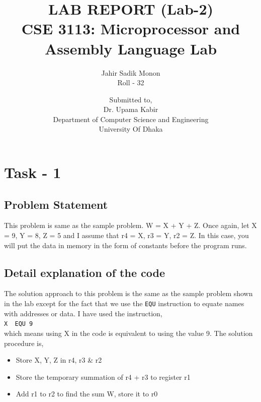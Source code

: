 \documentclass[footheight=20pt, footsepline, headheight=20pt, headsepline]{scrartcl}
\begin{document}
\title{LAB REPORT (Lab-2) \\[1cm] \large{\textbf{CSE 3113: Microprocessor and Assembly Language Lab}}\\[1cm]} 
\author{Jahir Sadik Monon \\ Roll - 32}
\date{\vspace{10cm}  Submitted to, \\[0.5cm] Dr. Upama Kabir \\[0.5cm] Department of Computer Science and Engineering \\[0.5cm] University Of Dhaka}
\maketitle
\newpage
\tableofcontents 
\newpage
\section*{Task - 1}
\subsection*{Problem Statement}
This problem is same as the sample problem. W = X + Y + Z. Once again, let X = 9, Y = 8, Z = 5 and I assume that r4 = X, r3 = Y, r2 = Z. In this case, you will put the data in memory in the form of constants before the program runs.
\subsection*{Detail explanation of the code}
The solution approach to this problem is the same as the sample problem shown in the lab except for the fact that we use the \verb|EQU| instruction to equate names with addresses or data. I have used the instruction,\\ \verb|X  EQU 9|\\ which means using X in the code is equivalent to using the value 9. The solution procedure is,
\begin{itemize}
  \item Store X, Y, Z in r4, r3 \& r2
  \item Store the temporary summation of r4 + r3 to register r1
  \item Add r1 to r2 to find the sum W, store it to r0
\end{itemize}
\end{document}
